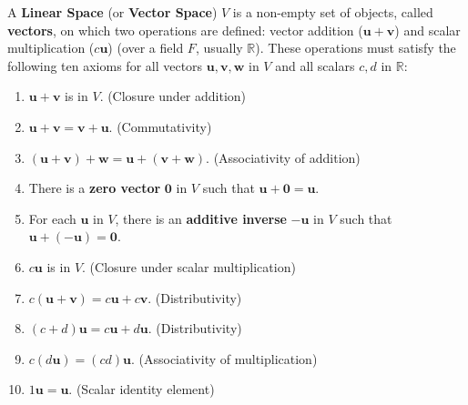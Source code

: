 \documentclass[oneside]{book}
\begin{document}
\begin{definition}
A \textbf{Linear Space} (or \textbf{Vector Space}) $V$ is a non-empty set of objects, called \textbf{vectors}, on which two operations are defined: vector addition ($\mathbf{u} + \mathbf{v}$) and scalar multiplication ($c\mathbf{u}$) (over a field $F$, usually $\mathbb{R}$). These operations must satisfy the following ten axioms for all vectors $\mathbf{u}, \mathbf{v}, \mathbf{w}$ in $V$ and all scalars $c, d$ in $\mathbb{R}$:

\begin{enumerate}
    \item $\mathbf{u} + \mathbf{v}$ is in $V$. (Closure under addition)
    \item $\mathbf{u} + \mathbf{v} = \mathbf{v} + \mathbf{u}$. (Commutativity)
    \item $(\mathbf{u} + \mathbf{v}) + \mathbf{w} = \mathbf{u} + (\mathbf{v} + \mathbf{w})$. (Associativity of addition)
    \item There is a \textbf{zero vector} $\mathbf{0}$ in $V$ such that $\mathbf{u} + \mathbf{0} = \mathbf{u}$.
    \item For each $\mathbf{u}$ in $V$, there is an \textbf{additive inverse} $-\mathbf{u}$ in $V$ such that $\mathbf{u} + (-\mathbf{u}) = \mathbf{0}$.
    \item $c\mathbf{u}$ is in $V$. (Closure under scalar multiplication)
    \item $c(\mathbf{u} + \mathbf{v}) = c\mathbf{u} + c\mathbf{v}$. (Distributivity)
    \item $(c+d)\mathbf{u} = c\mathbf{u} + d\mathbf{u}$. (Distributivity)
    \item $c(d\mathbf{u}) = (cd)\mathbf{u}$. (Associativity of multiplication)
    \item $1\mathbf{u} = \mathbf{u}$. (Scalar identity element)
\end{enumerate}
\end{definition}
\end{document}

